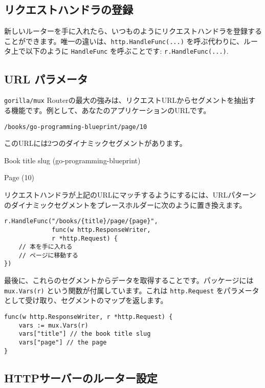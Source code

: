 \subsection{リクエストハンドラの登録}

新しいルーターを手に入れたら、いつものようにリクエストハンドラを登録することができます。唯一の違いは、\texttt{http.HandleFunc(...)} を呼ぶ代わりに、ルータ上で以下のように \texttt{HandleFunc} を呼ぶことです: \texttt{r.HandleFunc(...)}.

\subsection{URL パラメータ}

\texttt{gorilla/mux} Routerの最大の強みは、リクエストURLからセグメントを抽出する機能です。例として、あなたのアプリケーションのURLです。

\begin{lstlisting}[numbers=none]
/books/go-programming-blueprint/page/10
\end{lstlisting}

このURLには2つのダイナミックセグメントがあります。

Book title slug (go-programming-blueprint)

Page (10)

リクエストハンドラが上記のURLにマッチするようにするには、URLパターンのダイナミックセグメントをプレースホルダーに次のように置き換えます。


\begin{lstlisting}[numbers=none]
r.HandleFunc("/books/{title}/page/{page}",
             func(w http.ResponseWriter,
             r *http.Request) {
    // 本を手に入れる
    // ページに移動する
})
\end{lstlisting}

最後に、これらのセグメントからデータを取得することです。パッケージには \texttt{mux.Vars(r)} という関数が付属しています。これは \texttt{http.Request} をパラメータとして受け取り、セグメントのマップを返します。

\begin{lstlisting}[numbers=none]
func(w http.ResponseWriter, r *http.Request) {
    vars := mux.Vars(r)
    vars["title"] // the book title slug
    vars["page"] // the page
}
\end{lstlisting}

\subsection{HTTPサーバーのルーター設定}

